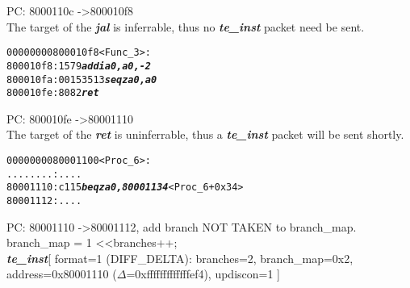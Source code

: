\begin{enumerate}
  \begin{frame}

  PC: 8000110c -\textgreater 800010f8\\
  The target of the \textbf{\textit{jal}} is inferrable, thus no \textbf{\textit{te\_inst}} packet need be sent.
  \end{frame}
  

\begin {alltt}
00000000800010f8 <Func\_3>:
    800010f8:	1579                    \textbf{\textit{addi	a0,a0,-2}}
    800010fa:	00153513                \textbf{\textit{seqz	a0,a0}}
    800010fe:	8082                    \textbf{\textit{ret}}
\end{alltt}

  \begin{frame}

  PC: 800010fe -\textgreater 80001110\\
  The target of the \textbf{\textit{ret}} is uninferrable, thus a \textbf{\textit{te\_inst}} packet will be sent shortly.
  \end{frame}
  
\begin{alltt}
  
0000000080001100 <Proc\_6>:
    ........:   ....
    80001110:	c115                	\textbf{\textit{beqz	a0,80001134}} <Proc\_6+0x34>
    80001112:	....
\end{alltt}

  \begin{frame}

  PC: 80001110 -\textgreater 80001112, add branch NOT TAKEN to branch\_map.\\
  branch\_map \textbar= 1 \textless\textless branches++;\\
  \textbf{\textit{te\_inst}}[ format=1 (DIFF\_DELTA): branches=2, branch\_map=0x2, address=0x80001110 ($\Delta$=0xfffffffffffffef4), updiscon=1 ]
  \end{frame}
  
  
\end{enumerate}

